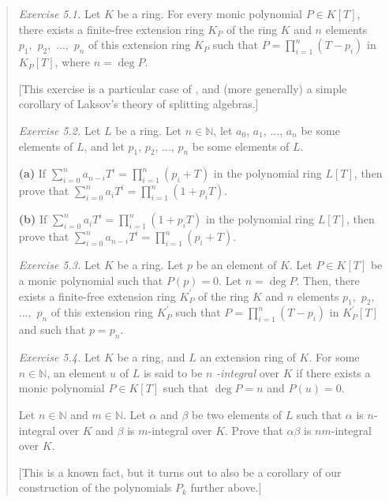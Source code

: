 \documentclass[numbers=enddot,12pt,final,onecolumn,notitlepage]{scrartcl}%
\begin{document}
\begin{quotation}
\textit{Exercise 5.1.} Let $K$ be a ring. For every monic polynomial $P\in
K\left[  T\right]  $, there exists a finite-free extension ring $K_{P}$ of the
ring $K$ and $n$ elements $p_{1},$ $p_{2},$ $...,$ $p_{n}$ of this extension
ring $K_{P}$ such that $P=\prod\limits_{i=1}^{n}\left(  T-p_{i}\right)  $ in
$K_{P}\left[  T\right]  $, where $n=\deg P$.

[This exercise is a particular case of \cite[Theorem 5.5]{Laksov09}, and (more
generally) a simple corollary of Laksov's theory of splitting algebras.]

\textit{Exercise 5.2.} Let $L$ be a ring. Let $n\in\mathbb{N}$, let $a_{0}$,
$a_{1}$, $...$, $a_{n}$ be some elements of $L$, and let $p_{1}$, $p_{2}$,
$...$, $p_{n}$ be some elements of $L$.

\textbf{(a)} If $\sum\limits_{i=0}^{n}a_{n-i}T^{i}=\prod\limits_{i=1}%
^{n}\left(  p_{i}+T\right)  $ in the polynomial ring $L\left[  T\right]  $,
then prove that $\sum\limits_{i=0}^{n}a_{i}T^{i}=\prod\limits_{i=1}^{n}\left(
1+p_{i}T\right)  $.

\textbf{(b)} If $\sum\limits_{i=0}^{n}a_{i}T^{i}=\prod\limits_{i=1}^{n}\left(
1+p_{i}T\right)  $ in the polynomial ring $L\left[  T\right]  $, then prove
that $\sum\limits_{i=0}^{n}a_{n-i}T^{i}=\prod\limits_{i=1}^{n}\left(
p_{i}+T\right)  $.

\textit{Exercise 5.3.} Let $K$ be a ring. Let $p$ be an element of $K$. Let
$P\in K\left[  T\right]  $ be a monic polynomial such that $P\left(  p\right)
=0$. Let $n=\deg P$. Then, there exists a finite-free extension ring
$K_{P}^{\prime}$ of the ring $K$ and $n$ elements $p_{1},$ $p_{2},$ $...,$
$p_{n}$ of this extension ring $K_{P}^{\prime}$ such that $P=\prod
\limits_{i=1}^{n}\left(  T-p_{i}\right)  $ in $K_{P}^{\prime}\left[  T\right]
$ and such that $p=p_{n}$.

\textit{Exercise 5.4.} Let $K$ be a ring, and $L$ an extension ring of $K$.
For some $n\in\mathbb{N}$, an element $u$ of $L$ is said to be $n$%
\textit{-integral} over $K$ if there exists a monic polynomial $P\in K\left[
T\right]  $ such that $\deg P=n$ and $P\left(  u\right)  =0$.

Let $n\in\mathbb{N}$ and $m\in\mathbb{N}$. Let $\alpha$ and $\beta$ be two
elements of $L$ such that $\alpha$ is $n$-integral over $K$ and $\beta$ is
$m$-integral over $K$. Prove that $\alpha\beta$ is $nm$-integral over $K$.

[This is a known fact, but it turns out to also be a corollary of our
construction of the polynomials $P_{k}$ further above.]


\end{quotation}
\end{document}
